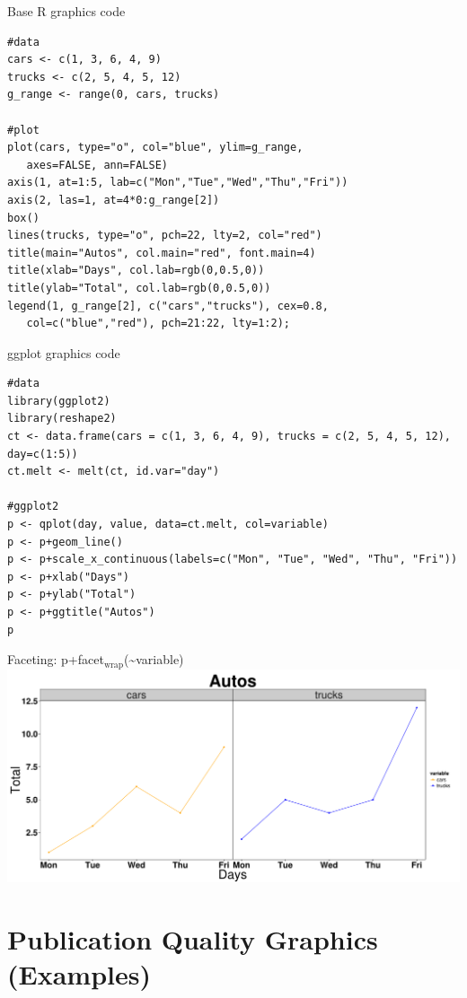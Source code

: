 \documentclass[t,10pt]{beamer}
\begin{document}
\begin{frame}[fragile,label={sec:orgheadline16}]{Base R graphics code}
 \begin{verbatim}
#data
cars <- c(1, 3, 6, 4, 9)
trucks <- c(2, 5, 4, 5, 12)
g_range <- range(0, cars, trucks)

#plot
plot(cars, type="o", col="blue", ylim=g_range, 
   axes=FALSE, ann=FALSE)
axis(1, at=1:5, lab=c("Mon","Tue","Wed","Thu","Fri"))
axis(2, las=1, at=4*0:g_range[2])
box()
lines(trucks, type="o", pch=22, lty=2, col="red")
title(main="Autos", col.main="red", font.main=4)
title(xlab="Days", col.lab=rgb(0,0.5,0))
title(ylab="Total", col.lab=rgb(0,0.5,0))
legend(1, g_range[2], c("cars","trucks"), cex=0.8, 
   col=c("blue","red"), pch=21:22, lty=1:2);
\end{verbatim}
\end{frame}



\begin{frame}[fragile,label={sec:orgheadline17}]{ggplot graphics code}
 \begin{verbatim}
#data
library(ggplot2)
library(reshape2)
ct <- data.frame(cars = c(1, 3, 6, 4, 9), trucks = c(2, 5, 4, 5, 12), day=c(1:5))
ct.melt <- melt(ct, id.var="day")

#ggplot2
p <- qplot(day, value, data=ct.melt, col=variable)
p <- p+geom_line()
p <- p+scale_x_continuous(labels=c("Mon", "Tue", "Wed", "Thu", "Fri"))
p <- p+xlab("Days")
p <- p+ylab("Total")
p <- p+ggtitle("Autos")
p
\end{verbatim}
\end{frame}


\begin{frame}[label={sec:orgheadline18}]{Faceting: p+facet\(_{\text{wrap}}\)(\textasciitilde{}variable)}
\includegraphics[width=.9\linewidth]{./faceted_plot.png}
\end{frame}

\section{Publication Quality Graphics (Examples)}
\label{sec:orgheadline22}
\end{document}
